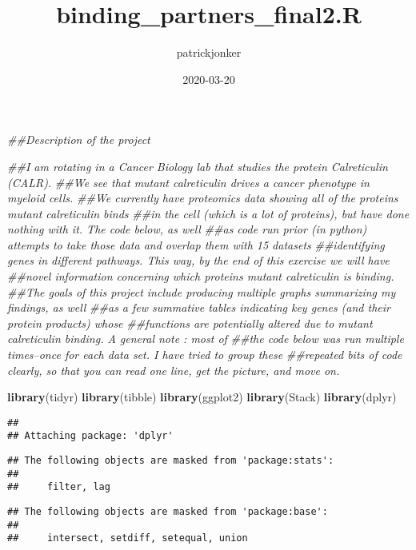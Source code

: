 \documentclass[]{article}
\title{binding\_partners\_final2.R}
\author{patrickjonker}
\date{2020-03-20}
\newenvironment{Shaded}{\begin{snugshade}}{\end{snugshade}}
\newcommand{\CommentTok}[1]{\textcolor[rgb]{0.56,0.35,0.01}{\textit{#1}}}
\newcommand{\KeywordTok}[1]{\textcolor[rgb]{0.13,0.29,0.53}{\textbf{#1}}}
\newcommand{\NormalTok}[1]{#1}
\begin{document}
\maketitle

\begin{Shaded}
\begin{Highlighting}[]
\CommentTok{##Description of the project}

\CommentTok{##I am rotating in a Cancer Biology lab that studies the protein Calreticulin (CALR). }
\CommentTok{##We see that mutant calreticulin drives a cancer phenotype in myeloid cells.}
\CommentTok{##We currently have proteomics data showing all of the proteins mutant calreticulin binds }
\CommentTok{##in the cell (which is a lot of proteins), but have done nothing with it. The code below, as well}
\CommentTok{##as code run prior (in python) attempts to take those data and overlap them with 15 datasets}
\CommentTok{##identifying genes in different pathways. This way, by the end of this exercise we will have}
\CommentTok{##novel information concerning which proteins mutant calreticulin is binding. }
\CommentTok{##The goals of this project include producing multiple graphs summarizing my findings, as well}
\CommentTok{##as a few summative tables indicating key genes (and their protein products) whose}
\CommentTok{##functions are potentially altered due to mutant calreticulin binding. A general note : most of}
\CommentTok{##the code below was run multiple times--once for each data set. I have tried to group these }
\CommentTok{##repeated bits of code clearly, so that you can read one line, get the picture, and move on.}


\KeywordTok{library}\NormalTok{(tidyr)}
\KeywordTok{library}\NormalTok{(tibble)}
\KeywordTok{library}\NormalTok{(ggplot2)}
\KeywordTok{library}\NormalTok{(Stack)}
\KeywordTok{library}\NormalTok{(dplyr)}
\end{Highlighting}
\end{Shaded}

\begin{verbatim}
## 
## Attaching package: 'dplyr'
\end{verbatim}

\begin{verbatim}
## The following objects are masked from 'package:stats':
## 
##     filter, lag
\end{verbatim}

\begin{verbatim}
## The following objects are masked from 'package:base':
## 
##     intersect, setdiff, setequal, union
\end{verbatim}
\end{document}
